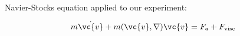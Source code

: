 Navier-Stocks equation applied to our experiment:

\begin{equation}
	m \dot{\vc{v}} + m (\vc{v}, \nabla) \vc{v} = F_\text{a} + F_\text{visc}
\end{equation}